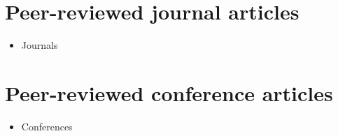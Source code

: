 \graphicspath{{9_BackMatter/figures/}}
\label{publications}

\section*{Peer-reviewed journal articles}
\begin{itemize}
  \item Journals
\end{itemize}

\section*{Peer-reviewed conference articles}
\begin{itemize}
  \item Conferences
\end{itemize}
